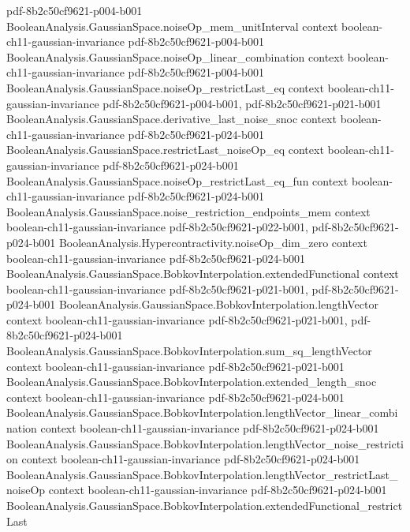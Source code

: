 \begin{theorem}
  {pdf-8b2c50cf9621-p004-b001}
\proofstep
  {BooleanAnalysis.GaussianSpace.noiseOp_mem_unitInterval}
  {context}
  {boolean-ch11-gaussian-invariance}
  {pdf-8b2c50cf9621-p004-b001}
\proofstep
  {BooleanAnalysis.GaussianSpace.noiseOp_linear_combination}
  {context}
  {boolean-ch11-gaussian-invariance}
  {pdf-8b2c50cf9621-p004-b001}
\proofstep
  {BooleanAnalysis.GaussianSpace.noiseOp_restrictLast_eq}
  {context}
  {boolean-ch11-gaussian-invariance}
  {pdf-8b2c50cf9621-p004-b001,
    pdf-8b2c50cf9621-p021-b001}
\proofstep
  {BooleanAnalysis.GaussianSpace.derivative_last_noise_snoc}
  {context}
  {boolean-ch11-gaussian-invariance}
  {pdf-8b2c50cf9621-p024-b001}
\proofstep
  {BooleanAnalysis.GaussianSpace.restrictLast_noiseOp_eq}
  {context}
  {boolean-ch11-gaussian-invariance}
  {pdf-8b2c50cf9621-p024-b001}
\proofstep
  {BooleanAnalysis.GaussianSpace.noiseOp_restrictLast_eq_fun}
  {context}
  {boolean-ch11-gaussian-invariance}
  {pdf-8b2c50cf9621-p024-b001}
\proofstep
  {BooleanAnalysis.GaussianSpace.noise_restriction_endpoints_mem}
  {context}
  {boolean-ch11-gaussian-invariance}
  {pdf-8b2c50cf9621-p022-b001,
    pdf-8b2c50cf9621-p024-b001}
\proofstep
  {BooleanAnalysis.Hypercontractivity.noiseOp_dim_zero}
  {context}
  {boolean-ch11-gaussian-invariance}
  {pdf-8b2c50cf9621-p024-b001}
\proofstep
  {BooleanAnalysis.GaussianSpace.BobkovInterpolation.extendedFunctional}
  {context}
  {boolean-ch11-gaussian-invariance}
  {pdf-8b2c50cf9621-p021-b001,
    pdf-8b2c50cf9621-p024-b001}
\proofstep
  {BooleanAnalysis.GaussianSpace.BobkovInterpolation.lengthVector}
  {context}
  {boolean-ch11-gaussian-invariance}
  {pdf-8b2c50cf9621-p021-b001,
    pdf-8b2c50cf9621-p024-b001}
\proofstep
  {BooleanAnalysis.GaussianSpace.BobkovInterpolation.sum_sq_lengthVector}
  {context}
  {boolean-ch11-gaussian-invariance}
  {pdf-8b2c50cf9621-p021-b001}
\proofstep
  {BooleanAnalysis.GaussianSpace.BobkovInterpolation.extended_length_snoc}
  {context}
  {boolean-ch11-gaussian-invariance}
  {pdf-8b2c50cf9621-p024-b001}
\proofstep
  {BooleanAnalysis.GaussianSpace.BobkovInterpolation.lengthVector_linear_combination}
  {context}
  {boolean-ch11-gaussian-invariance}
  {pdf-8b2c50cf9621-p024-b001}
\proofstep
  {BooleanAnalysis.GaussianSpace.BobkovInterpolation.lengthVector_noise_restriction}
  {context}
  {boolean-ch11-gaussian-invariance}
  {pdf-8b2c50cf9621-p024-b001}
\proofstep
  {BooleanAnalysis.GaussianSpace.BobkovInterpolation.lengthVector_restrictLast_noiseOp}
  {context}
  {boolean-ch11-gaussian-invariance}
  {pdf-8b2c50cf9621-p024-b001}
\proofstep
  {BooleanAnalysis.GaussianSpace.BobkovInterpolation.extendedFunctional_restrictLast}

\end{theorem}

